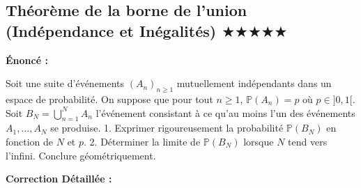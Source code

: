 \documentclass[11pt,a4paper]{article}
\begin{document}
\subsection*{ Théorème de la borne de l'union (Indépendance et Inégalités) \quad $\bigstar\bigstar\bigstar\bigstar\bigstar$}

\textbf{Énoncé :}

Soit une suite d'événements $(A_n)_{n \geq 1}$ mutuellement indépendants dans un espace de probabilité.
On suppose que pour tout $n \geq 1$, $\mathbb{P}(A_n) = p$ où $p \in ]0, 1[$.
Soit $B_N = \bigcup_{n=1}^N A_n$ l'événement consistant à ce qu'au moins l'un des événements $A_1, \dots, A_N$ se produise.
1. Exprimer rigoureusement la probabilité $\mathbb{P}(B_N)$ en fonction de $N$ et $p$.
2. Déterminer la limite de $\mathbb{P}(B_N)$ lorsque $N$ tend vers l'infini. Conclure géométriquement.

\textbf{Correction Détaillée :}
\end{document}
